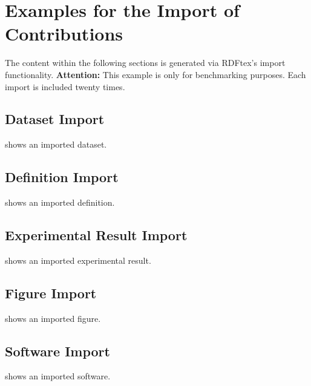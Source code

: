 
\section{Examples for the Import of Contributions}

The content within the following sections is generated via RDFtex's import functionality. \textbf{Attention:} This example is only for benchmarking purposes. Each import is included twenty times. 


\subsection{Dataset Import}


 shows an imported dataset.

\subsection{Definition Import}


 shows an imported definition.

\subsection{Experimental Result Import}


 shows an imported experimental result.

\subsection{Figure Import}


 shows an imported figure.

\subsection{Software Import}


 shows an imported software.



